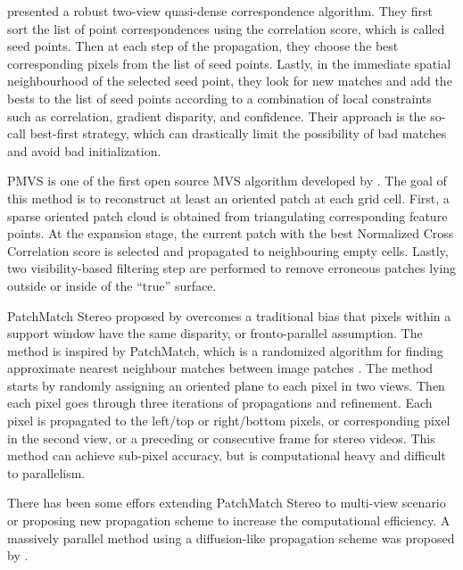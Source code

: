 \citeauthor{lhuillier2005quasi} presented a robust two-view quasi-dense correspondence algorithm. They first sort the list of point correspondences using the correlation score, which is called seed points. Then at each step of the propagation, they choose the best corresponding pixels from the list of seed points. Lastly, in the immediate spatial neighbourhood of the selected seed point, they look for new matches and add the bests to the list of seed points according to a combination of local constraints such as correlation, gradient disparity, and confidence. Their approach is the so-call best-first strategy, which can drastically limit the possibility of bad matches and avoid bad initialization.

PMVS is one of the first open source MVS algorithm developed by \citeauthor{furukawa2010accurate}. The goal of this method is to reconstruct at least an oriented patch at each grid cell. First, a sparse oriented patch cloud is obtained from triangulating corresponding feature points. At the expansion stage, the current patch with the best Normalized Cross Correlation score is selected and propagated to neighbouring empty cells. Lastly, two visibility-based filtering step are performed to remove erroneous patches lying outside or inside of the ``true'' surface.

PatchMatch Stereo proposed by \citeauthor{bleyer2011patchmatch} overcomes a traditional bias that pixels within a support window have the same disparity, or fronto-parallel assumption. The method is inspired by PatchMatch, which is a randomized algorithm for finding approximate nearest neighbour matches between image patches \cite{Barnes:2009:PAR}. The method starts by randomly assigning an oriented plane to each pixel in two views. Then each pixel goes through three iterations of propagations and refinement. Each pixel is propagated to the left/top or right/bottom pixels, or corresponding pixel in the second view, or a preceding or consecutive frame for stereo videos. This method can achieve sub-pixel accuracy, but is computational heavy and difficult to parallelism.

There has been some effors extending PatchMatch Stereo to multi-view scenario or proposing new propagation scheme to increase the computational efficiency. A massively parallel method using a diffusion-like propagation scheme was proposed by \citeauthor{galliani2015massively}.



